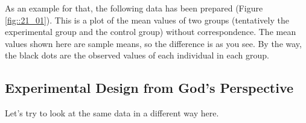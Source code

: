 \documentclass{ltjbook}
\begin{document}
As an example for that, the following data has been prepared (Figure \ref{fig::21_01}). This is a plot of the mean values of two groups (tentatively the experimental group and the control group) without correspondence. The mean values shown here are sample means, so the difference is as you see. By the way, the black dots are the observed values of each individual in each group.




\subsection{Experimental Design from God's Perspective}
Let's try to look at the same data in a different way here.
\end{document}
